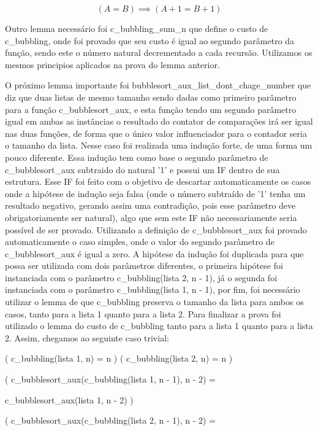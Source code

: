\documentclass[12pt]{article}
\begin{document}
\begin{equation}
 ( A = B ) \implies ( A + 1 = B + 1 )
 \end{equation}

Outro lemma necessário foi c\_bubbling\_sum\_n que define o custo de c\_bubbling, onde foi provado que seu custo é igual ao segundo parâmetro da função, sendo este o número natural decrementado a cada recursão. Utilizamos os mesmos principios aplicados na prova do lemma anterior. 

O próximo lemma importante foi bubblesort\_aux\_list\_dont\_chage\_number que diz que duas listas de mesmo tamanho sendo dadas como primeiro parâmetro para a função c\_bubblesort\_aux, e esta função tendo um segundo parâmetro igual em ambas as instâncias o resultado do contator de comparações irá ser igual nas duas funções, de forma que o único valor influenciador para o contador seria o tamanho da lista. Nesse caso foi realizada uma indução forte, de uma forma um pouco diferente. Essa indução tem como base o segundo parâmetro de c\_bubblesort\_aux subtraido do natural '1' e possui um IF dentro de sua estrutura. Esse IF foi feito com o objetivo de descartar automaticamente os casos onde a hipótese de indução seja falsa (onde o número subtraído de '1' tenha um resultado negativo, gerando assim uma contradição, pois esse parâmetro deve obrigatoriamente ser natural), algo que sem este IF não necessariamente seria possível de ser provado. Utilizando a definição de c\_bubblesort\_aux foi provado automaticamente o caso simples, onde o valor do segundo parâmetro de c\_bubblesort\_aux é igual a zero. A hipótese da indução foi duplicada para que possa ser utilizada com dois parâmetros diferentes, o primeira hipótese foi instanciada com o parâmetro c\_bubbling(lista 2, n - 1), já o segunda foi instanciada com o parâmetro c\_bubbling(lista 1, n - 1), por fim, foi necessário utilizar o lemma de que c\_bubbling preserva o tamanho da lista para ambos os casos, tanto para a lista 1 quanto para a lista 2. Para finalizar a prova foi utilizado o lemma do custo de c\_bubbling tanto para a lista 1 quanto para a lista 2. Assim, chegamos ao seguinte caso trivial: 
\newline

( c\_bubbling(lista 1, n) = n ) \wedge ( c\_bubbling(lista 2, n) = n ) \wedge 

( c\_bubblesort\_aux(c\_bubbling(lista 1, n - 1), n - 2) =

c\_bubblesort\_aux(lista 1, n - 2) ) \wedge 

( c\_bubblesort\_aux(c\_bubbling(lista 2, n - 1), n - 2) = 
\end{document}
